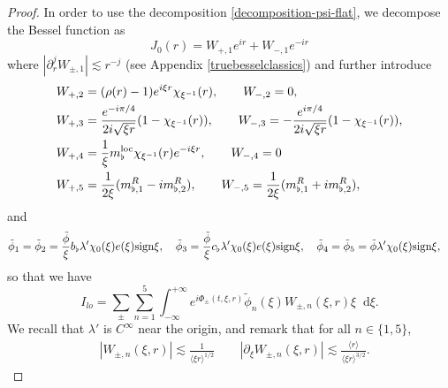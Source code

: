 \documentclass[11 pt]{amsart}
\theoremstyle{definition}
\theoremstyle{remark}
\numberwithin{equation}{section}
\newcommand{\dd}{\mathop{}\!\mathrm{d}}
\begin{document}
\begin{proof}
In order to use the decomposition \eqref{decomposition-psi-flat}, we decompose the Bessel function as
$$
J_0(r)=W_{+,1}e^{ir}+W_{-,1}e^{-ir}
$$
where $|\partial_r^j W_{\pm,1}|\lesssim r^{-j}$ (see Appendix \ref{truebesselclassics}) and further introduce
\begin{align*}
& W_{+,2}=(\rho(r)-1)e^{i\xi r}\chi_{\xi^{-1}}(r), \qquad W_{-,2}=0,\\
& W_{+,3}=\frac{e^{-i\pi/4}}{2i\sqrt{\xi r}}(1-\chi_{\xi^{-1}}(r)), \qquad W_{-,3}=- \frac{e^{i\pi/4}}{2i\sqrt{\xi r}}(1-\chi_{\xi^{-1}}(r)),\\
& W_{+,4}=\frac{1}{\xi}m_\flat^{\textup{loc}}\chi_{\xi^{-1}}(r)e^{-i\xi r}, \qquad W_{-,4}=0\\
& W_{+,5}=\frac{1}{2\xi}(m^R_{\flat,1}-im^R_{\flat,2}), \qquad W_{-,5}=\frac{1}{2\xi}( m^R_{\flat,1}+im^R_{\flat,2}),
\end{align*}
and
\begin{align} \label{definition-tildephi1}
& \tilde \phi_1=\tilde \phi_2=\frac{\tilde \phi}{\xi}b_\flat\lambda' \chi_0(\xi)e(\xi)\textup{sign}\xi, \quad \tilde \phi_{3}=\frac{\tilde \phi}{\xi}c_\flat\lambda' \chi_0(\xi)e(\xi) \textup{sign}\xi ,\quad \tilde \phi_4=\tilde \phi_5= \tilde{\phi}\lambda'\chi_0(\xi)\textup{sign}\xi,
\end{align}
so that we have
$$
I_{lo} = \sum_{\pm}\sum_{n=1}^5 \int_{-\infty}^{+\infty} e^{i \Phi_{\pm}(t,\xi,r)} \widetilde{\phi}_n(\xi) W_{\pm,n}(\xi,r) \xi \dd \xi .
$$
We recall that $\lambda'$ is $C^\infty$ near the origin, and remark that for all $n\in \{1,5\}$,
\begin{equation}
\label{estimateWa2}
\begin{split}
& | W_{\pm,n}(\xi,r)  | \lesssim \frac{1}{\langle \xi r \rangle^{1/2}} \qquad
| \partial_{\xi} W_{\pm,n}(\xi,r)  | \lesssim \frac{\langle r \rangle}{\langle \xi r \rangle^{3/2}}.
\end{split}
\end{equation}


\end{proof}
\end{document}
